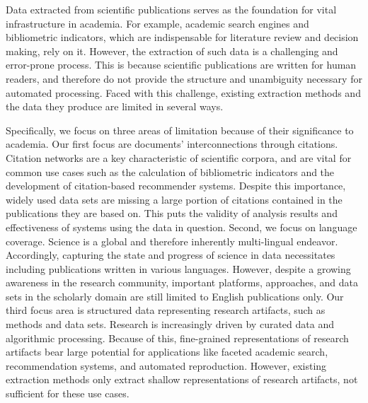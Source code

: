 \Abstract{}
Data extracted from scientific publications serves as the foundation for vital infrastructure in academia.
For example, academic search engines and bibliometric indicators, which are indispensable for literature review and decision making, %
rely on it.
However, the extraction of such data is a challenging and error-prone process.
This is because scientific publications are written for human readers, and therefore do not provide the structure and unambiguity necessary for automated processing. Faced with this challenge, existing extraction methods and the data they produce are limited in several ways. %

Specifically,
we focus on three areas of limitation because of their significance to academia.
Our first focus are documents' interconnections through citations.
Citation networks are a key characteristic of scientific corpora, and are vital for common use cases such as the calculation of bibliometric indicators and the development of citation-based recommender systems. Despite this importance, widely used data sets %
are missing a large portion of citations contained in the publications they are based on.
This puts the validity of analysis results and effectiveness of systems using the data in question.
Second, we focus on language coverage.
Science is a global and therefore inherently multi-lingual endeavor. Accordingly, capturing the state and progress of science in data necessitates including publications written in various languages. However, despite a growing awareness in the
research community, important platforms, approaches, and data sets in the scholarly domain are still limited to English publications only. %
Our third focus area is structured data representing research artifacts, such as methods and data sets. Research is increasingly driven by curated data and algorithmic processing. Because of this, fine-grained representations of research artifacts bear large potential for applications like faceted academic search, recommendation systems, and automated reproduction. However, existing extraction methods only extract shallow representations of research artifacts, not sufficient for these use cases.

